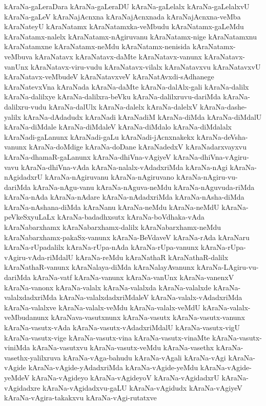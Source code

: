 {kAraNa-gaLeraDara
kAraNa-gaLeraDU
kAraNa-gaLelalx
kAraNa-gaLelalxvU
kAraNa-gaLeV
kAraNajAcnxna
kAraNajAcnxnada
kAraNajAcnxna-veMba
kAraNateyU
kAraNatamx
kAraNatamxka-veMbudu
kAraNatamx-gaLeMdu
kAraNatamx-nalelx
kAraNatamx-nAgiruvanu
kAraNatamx-nige
kAraNatamxnu
kAraNatamxne
kAraNatamx-neMdu
kAraNatamx-nenisida
kAraNatamx-veMbuva
kAraNatavx
kAraNatavx-daMte
kAraNatavx-vanunx
kAraNatavx-vanUnx
kAraNatavx-viru-vudu
kAraNatavx-vilalx
kAraNatavxvu
kAraNatavxvU
kAraNatavx-veMbudeV
kAraNatavxveV
kAraNatAvxdi-sAdhanege
kAraNatevxVna
kAraNada
kAraNa-daMte
kAraNa-dalAlx-gali
kAraNa-dalilx
kAraNa-dalilxye
kAraNa-dalilxra-beVku
kAraNa-dalilxruvu-dariMda
kAraNa-dalilxru-vudu
kAraNa-dalUlx
kAraNa-dalelx
kAraNa-dalelxV
kAraNa-dashe-yalilx
kAraNa-dAdadudx
kAraNadi
kAraNadiM
kAraNa-diMda
kAraNa-diMdalU
kAraNa-diMdale
kAraNa-diMdaleV
kAraNa-diMdalo
kAraNa-diMdalalx
kAraNadi-gaLanunx
kAraNadi-gaLu
kAraNadi-jAcnxnakekx
kAraNa-deVsha-vanunx
kAraNa-doMdige
kAraNa-doDane
kAraNadedxV
kAraNadarxvayxvu
kAraNa-dhamaR-gaLanunx
kAraNa-dhiVna-vAgiyeV
kAraNa-dhiVna-vAgiru-vavu
kAraNa-dhiVna-vAda
kAraNa-nalalx-vAdadxriMda
kAraNa-nAgi
kAraNa-nAgidadxrU
kAraNa-nAgiruvanu
kAraNa-nAgiruvano
kAraNa-nAgiru-vu-dariMda
kAraNa-nAgu-vanu
kAraNa-nAguva-neMdu
kAraNa-nAguvuda-riMda
kAraNa-nAda
kAraNa-nAdare
kAraNa-nAdadxriMda
kAraNa-nAsha-diMda
kAraNa-nAshana-diMda
kAraNanu
kAraNa-neMdu
kAraNa-neMdU
kAraNa-peVkeSxyuLaLx
kAraNa-badadhxsutx
kAraNa-boVdhaka-vAda
kAraNabarxhamx
kAraNabarxhamx-dalilx
kAraNabarxhamx-neMdu
kAraNabarxhamx-pakaSx-vanunx
kAraNa-BeVdaveV
kAraNa-rAda
kAraNaru
kAraNa-rUpadalilx
kAraNa-rUpa-nAda
kAraNa-rUpa-vanunx
kAraNa-rUpa-vAgiru-vAda-riMdalU
kAraNa-reMdu
kAraNathaR
kAraNathaR-dalilx
kAraNathaR-vanunx
kAraNalaya-diMda
kAraNalayAvanunx
kAraNa-LAgiru-vu-dariMda
kAraNa-vatf
kAraNa-vanunx
kAraNa-vanUnx
kAraNa-vanenxV
kAraNa-vanonx
kAraNa-valalx
kAraNa-valalxda
kAraNa-valalxde
kAraNa-valalxdadxriMda
kAraNa-valalxdadxriMdaleV
kAraNa-valalx-vAdadxriMda
kAraNa-valalxve
kAraNa-valalx-veMdu
kAraNa-valalx-veMdU
kAraNa-valalx-veMbudanunx
kAraNava-vasutxnunx
kAraNa-vasutx
kAraNa-vasutx-vanunx
kAraNa-vasutx-vAda
kAraNa-vasutx-vAdadxriMdalU
kAraNa-vasutx-vigU
kAraNa-vasutx-vige
kAraNa-vasutx-vina
kAraNa-vasutx-vinaMte
kAraNa-vasutx-viniMda
kAraNa-vasutxvu
kAraNa-vasutx-veMdu
kAraNa-vasethx
kAraNa-vasethx-yalilxruva
kAraNa-vAga-bahudu
kAraNa-vAgali
kAraNa-vAgi
kAraNa-vAgide
kAraNa-vAgide-yAdadxriMda
kAraNa-vAgide-yeMdu
kAraNa-vAgide-yeMdeV
kAraNa-vAgideyo
kAraNa-vAgideyoV
kAraNa-vAgidadxrU
kAraNa-vAgidadxre
kAraNa-vAgidadxvu-gaLU
kAraNa-vAgidudx
kAraNa-vAgiyeV
kAraNa-vAgira-takakxvu
kAraNa-vAgi-rutatxve
}
